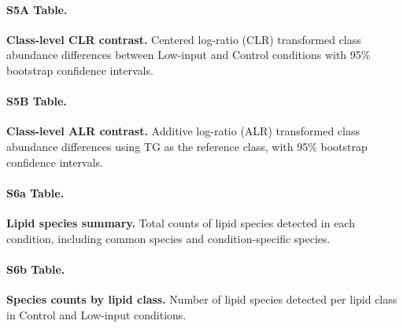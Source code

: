 \documentclass[9pt,twocolumn,twoside]{rilabRxiv}
\begin{document}
\paragraph*{S5A Table.}
\makeatletter
\def\@currentlabelname{S5A Table} 
\makeatother
\label{S5A_Table}                                                                                  
\textbf{Class-level CLR contrast.} Centered log-ratio (CLR) transformed class abundance differences between Low-input and Control conditions with 95\% bootstrap confidence intervals.                 
                                                                                                 
\paragraph*{S5B Table.}
\makeatletter
\def\@currentlabelname{S5B Table} 
\makeatother
\label{S5B_Table}                                                                                  
\textbf{Class-level ALR contrast.} Additive log-ratio (ALR) transformed class abundance differences using TG as the reference class, with 95\% bootstrap confidence intervals.                        
                                                                                                 
\paragraph*{S6a Table.}
\makeatletter
\def\@currentlabelname{S6a Table} 
\makeatother
\label{S6a_Table}                                                                                  
\textbf{Lipid species summary.} Total counts of lipid species detected in each condition, including common species and condition-specific species.                                                    
                                                                                                 
\paragraph*{S6b Table.}
\makeatletter
\def\@currentlabelname{S6b Table} 
\makeatother
\label{S6b_Table}                                                                                  
\textbf{Species counts by lipid class.} Number of lipid species detected per lipid class in Control and Low-input conditions.                                                                          
                                                                                                 
\end{document}
